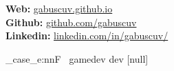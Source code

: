 \documentclass[9pt]{developercv} %
\begin{document}
\begin{minipage}[t]{0.30\textwidth} %
	\vspace{-\baselineskip} %
	
	\textbf{Web: }{\href{https://gabuscuv.github.io}{gabuscuv.github.io}}\\
	\textbf{Github: }{\href{https://github.com/gabuscuv}{github.com/gabuscuv}}\\
	\textbf{Linkedin: }{\href{https://www.linkedin.com/in/gabuscuv/}{linkedin.com/in/gabuscuv/}}\\
\end{minipage}


\vspace{0.5cm}





\MainTechnologies{\langsa}{\jobtype}
\hfill
\ContributonsAndForks{\langsa}{\jobtype}
\hfill
\AdditionalInformation{\langsa}{\jobtype}

\ExplSyntaxOn

\str_case_e:nnF~{\jobtype}
{
	{gamedev}{
		\Projects{\langsa}{\jobtype}
		\JobExperience{\langsa}{\jobtype}
		}
	{dev}
	{
		\JobExperience{\langsa}{\jobtype}
		\Projects{\langsa}{\jobtype}
	}
}
{[null]}%

\ExplSyntaxOff


\Education{\langsa}{\jobtype}

\Courses{\langsa}{\jobtype}

\end{document}
